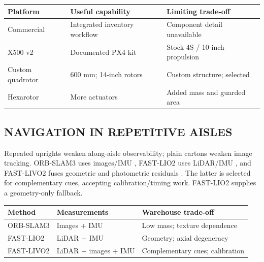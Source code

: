\documentclass[a4paper,11pt]{article}
\begin{document}
\par\addvspace{8pt}\noindent\begin{minipage}{\linewidth}\centering
{}\label{tab:1}
\begin{tabular}{C{0.290\dimexpr\linewidth-24pt\relax}C{0.290\dimexpr\linewidth-24pt\relax}C{0.420\dimexpr\linewidth-24pt\relax}}
\toprule
\textbf{Platform} & \textbf{Useful capability} & \textbf{Limiting trade-off}\\\midrule
Commercial \cite{r3,r4} & Integrated inventory workflow & Component detail unavailable\\
X500 v2 \cite{r5} & Documented PX4 kit & Stock 4S / 10-inch propulsion\\
Custom quadrotor & 600 mm; 14-inch rotors & Custom structure; selected\\
Hexarotor & More actuators & Added mass and guarded area\\
\bottomrule\end{tabular}\end{minipage}\par\addvspace{8pt}
\subsection{N{\fontsize{9.2}{14}\selectfont AVIGATION} {\fontsize{9.2}{14}\selectfont IN} {\fontsize{9.2}{14}\selectfont REPETITIVE} {\fontsize{9.2}{14}\selectfont AISLES}}
Repeated uprights weaken along-aisle observability; plain cartons weaken image tracking. ORB-SLAM3 uses images/IMU \cite{r20}, FAST-LIO2 uses LiDAR/IMU \cite{r19}, and FAST-LIVO2 fuses geometric and photometric residuals \cite{r21}. The latter is selected for complementary cues, accepting calibration/timing work. FAST-LIO2 supplies a geometry-only fallback.

\par\addvspace{8pt}\noindent\begin{minipage}{\linewidth}\centering
{}\label{tab:2}
\begin{tabular}{C{0.290\dimexpr\linewidth-24pt\relax}C{0.290\dimexpr\linewidth-24pt\relax}C{0.420\dimexpr\linewidth-24pt\relax}}
\toprule
\textbf{Method} & \textbf{Measurements} & \textbf{Warehouse trade-off}\\\midrule
ORB-SLAM3 \cite{r20} & Images + IMU & Low mass; texture dependence\\
FAST-LIO2 \cite{r19} & LiDAR + IMU & Geometry; axial degeneracy\\
FAST-LIVO2 \cite{r21} & LiDAR + images + IMU & Complementary cues; calibration\\
\bottomrule\end{tabular}\end{minipage}\par\addvspace{8pt}
\end{document}
